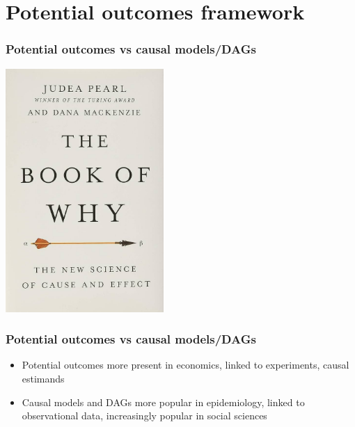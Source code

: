 \documentclass[aspectratio=43]{beamer}
\begin{document}
%
%
%

\section{Potential outcomes framework}

\begin{frame}
\frametitle{Potential outcomes vs causal models/DAGs}
\centering

\includegraphics[width = 0.45\textwidth]{../img/the_book_of_why}

\end{frame}

\begin{frame}
\frametitle{Potential outcomes vs causal models/DAGs}
\centering

\begin{itemize}
  \item Potential outcomes more present in economics, linked to experiments, causal estimands
  \item Causal models and DAGs more popular in epidemiology, linked to observational data, increasingly popular in social sciences
\end{itemize}


\end{frame}
\end{document}
